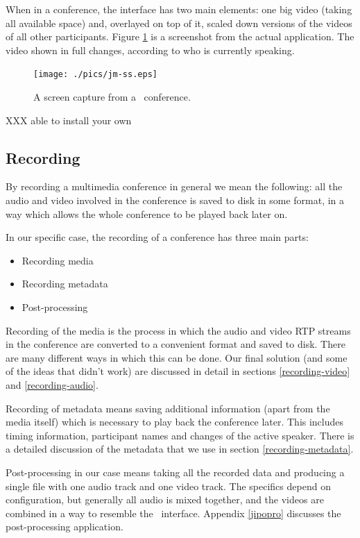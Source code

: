 \documentclass[twoside,openright,a4paper,11pt,english]{article}
\begin{document}
When in a conference, the interface has two main elements: one big video
(taking all available space) and, overlayed on top of it,
scaled down versions of the videos of all other participants. Figure
\ref{jm-ss} is a screenshot from the actual application. The video shown in
full changes, according to who is currently speaking.

\begin{figure}[h]
    \texttt{[image: ./pics/jm-ss.eps]}
    \label{jm-ss}
    \caption{A screen capture from a \jm\ conference.}
\end{figure}

XXX able to install your own \jm



\subsection{Recording}
\label{intro-recording}
By recording a multimedia conference in general we mean the following: all the
audio and video involved in the conference
is saved to disk in some format, in a way which allows the whole conference to
be played back later on.

\medskip
In our specific case, the recording of a conference has three main parts:
\begin{itemize}
\item{Recording media}
\item{Recording metadata}
\item{Post-processing}
\end{itemize}

Recording of the media is the process in which the audio and video RTP streams
in the conference are converted to a convenient format and saved to disk. There
are many different ways in which this can be done. Our final solution (and some
of the ideas that didn't work) are discussed in detail in
sections \ref{recording-video} and \ref{recording-audio}.

Recording of metadata means saving additional information (apart from the media
itself) which is necessary to play back the conference later. This includes
timing information, participant names and changes of the active speaker. There
is a detailed discussion of the
metadata that we use in section \ref{recording-metadata}.

Post-processing in our case means taking all the recorded data and producing a
single file with one audio track and one video track. The specifics depend on
configuration, but
generally all audio is mixed together, and the videos are combined in a way to
resemble the \jm\ interface. Appendix \ref{jipopro} discusses the
post-processing application.
\end{document}
